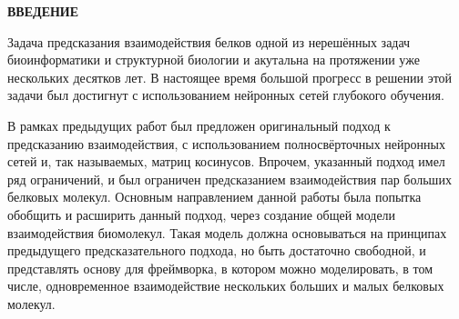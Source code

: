 \newpage
\renewcommand{\contentsname}{\centerline{\large ОГЛАВЛЕНИЕ}}
\tableofcontents

\newpage
{}
\begin{center}
	\textbf{\large ВВЕДЕНИЕ}
\end{center}

Задача предсказания взаимодействия белков одной из нерешённых задач биоинформатики и структурной биологии и акутальна на протяжении уже нескольких десятков лет. В настоящее время большой прогресс в решении этой задачи был достигнут с использованием нейронных сетей глубокого обучения.

В рамках предыдущих работ \cite{prip2023} был предложен оригинальный подход к предсказанию взаимодействия, с использованием полносвёрточных нейронных сетей \cite{fully_conv} и, так называемых, матриц косинусов. Впрочем, указанный подход имел ряд ограничений, и был ограничен предсказанием взаимодействия пар больших белковых молекул. Основным направлением данной работы была попытка обобщить и расширить данный подход, через создание общей модели взаимодействия биомолекул. Такая модель должна основываться на принципах предыдущего предсказательного подхода, но быть достаточно свободной, и представлять основу для фреймворка, в котором можно моделировать, в том числе, одновременное взаимодействие нескольких больших и малых белковых молекул.



